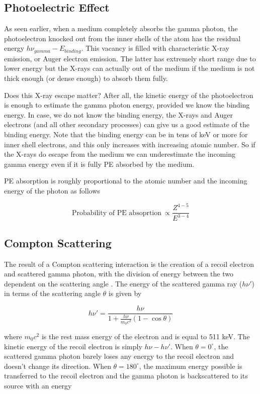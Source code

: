 \documentclass{article}
\begin{document}
\subsection{Photoelectric Effect}

As seen earlier, when a medium completely absorbs the gamma photon, the photoelectron knocked out from the inner shells of the atom has the residual energy $h\nu_{gamma}-E_{binding}$. This vacancy is filled with characteristic X-ray emission, or Auger electron emission.
The latter has extremely short range due to lower energy but the X-rays can actually out of the medium if the medium is not thick enough (or dense enough) to absorb them fully.


Does this X-ray escape matter? After all, the kinetic energy of the photoelectron is enough to estimate the gamma photon energy, provided we know the binding energy. In case, we do not know the binding energy,
the X-rays and Auger electrons (and all other secondary processes) can give us a good estimate of the binding energy. Note that the binding energy can be in tens of keV or more for inner shell electrons, and this only increases with increasing atomic number. So if the X-rays do escape from the medium
we can underestimate the incoming gamma energy even if it is fully PE absorbed by the medium.

PE absorption is roughly proportional to the atomic number and the incoming energy of the photon as follows \cite{Knoll2000}

\[\text{Probability of PE absoprtion} \, \propto \frac{Z^{4-5}}{E^{3-4}}\]

\subsection{Compton Scattering}

The result of a Compton scattering interaction is the creation of a recoil electron and scattered gamma photon, with the division of energy between the two dependent on the scattering angle \cite{Knoll2000}.
The energy of the scattered gamma ray ($h\nu'$) in terms of the scattering angle $\theta$ is given by 

\[h\nu' = \frac{h\nu}{1+\frac{h\nu}{m_0c^2}(1-\cos \theta)}\]

where $m_0c^2$ is the rest mass energy of the electron and is equal to 511 keV. The kinetic energy of the recoil electron is simply $h\nu - h \nu'$. 
When $\theta = 0^\circ$, the scattered gamma photon barely loses any energy to the recoil electron and doesn't change its direction. When $\theta = 180^\circ$,
the maximum energy possible is transferred to the recoil electron and the gamma photon is backscattered to its source with an energy
\end{document}

